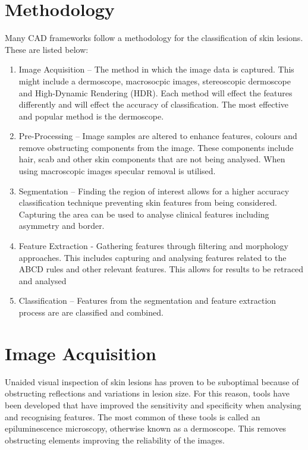 \documentclass[12pt]{report}
\begin{document}
\section{Methodology}
Many CAD frameworks follow a methodology for the classification of skin lesions\cite{}. These are listed below:

\begin{enumerate}

	\item Image Acquisition – The method in which the image data is captured. This might include a dermoscope, macrosocpic images, stereoscopic dermoscope and High-Dynamic Rendering (HDR). Each method will effect the features differently and will effect the accuracy of classification. The most effective and popular method is the dermoscope.
	
	\item Pre-Processing – Image samples are altered to enhance features, colours and remove obstructing components from the image. These components include hair, scab and other skin components that are not being analysed. When using macroscopic images specular removal is utilised.
	
	\item Segmentation – Finding the region of interest allows for a higher accuracy classification technique preventing skin features from being considered. Capturing the area can be used to analyse clinical features including asymmetry and border.
	
	\item Feature Extraction - Gathering features through filtering and morphology approaches. This includes capturing and analysing features related to the ABCD rules and other relevant features. This allows for results to be retraced and analysed 
	
	\item Classification – Features from the segmentation and feature extraction process are are classified and combined.
	
\end{enumerate}	

\section{Image Acquisition}
Unaided visual inspection of skin lesions has proven to be suboptimal because of obstructing reflections and variations in lesion size. For this reason, tools have been developed that have improved the sensitivity and specificity when analysing and recognising features. The most common of these tools is called an epiluminescence microscopy, otherwise known as a dermoscope. This removes obstructing elements improving the reliability of the images.
\end{document}
